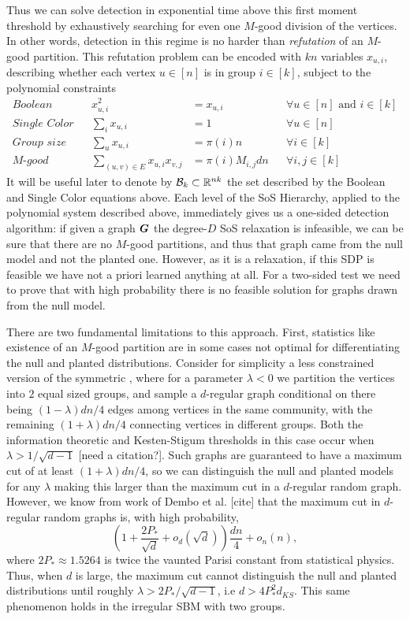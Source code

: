 Thus we can solve detection in exponential time above this first moment threshold by exhaustively searching for even one $M$-good division of the vertices. In other words, detection in this regime is no harder than \emph{refutation} of an $M$-good partition. This refutation problem can be encoded with $kn$ variables $x_{u,i}$, describing whether each vertex $u \in [n]$ is in group $i \in [k]$, subject to the polynomial constraints
%
\begin{align*}
	\textit{Boolean} & & x_{u,i}^2 &= x_{u,i} & &\forall u\in[n] \text{ and } i\in [k] \\
	\textit{Single Color} & & \sum_i x_{u,i} &= 1 & &\forall u\in[n] \\
	\textit{Group size} & &\sum_u x_{u,i} &= \pi(i)n  & & \forall i\in[k]\\
	\textit{$M$-good} & &\sum_{(u,v)\in E} x_{u,i}x_{v,j} &= \pi(i)M_{i,j}dn & &\forall i,j\in[k]
\end{align*}
%
It will be useful later to denote by $\mathcal{B}_k \subset \mathbb{R}^{nk}$ the set described by the Boolean and Single Color equations above. Each level of the SoS Hierarchy, applied to the polynomial system described above, immediately gives us a one-sided detection algorithm: if given a graph $\boldsymbol{G}$ the degree-$D$ SoS relaxation is infeasible, we can be sure that there are no $M$-good partitions, and thus that graph came from the null model and not the planted one. However, as it is a relaxation, if this SDP is feasible we have not a priori learned anything at all. For a two-sided test we need to prove that with high probability there is no feasible solution for graphs drawn from the null model. 

There are two fundamental limitations to this approach. First, statistics like existence of an $M$-good partition are in some cases not optimal for differentiating the null and planted distributions. Consider for simplicity a less constrained version of the symmetric \model, where for a parameter $\lambda<0$ we partition the vertices into $2$ equal sized groups, and sample a $d$-regular graph conditional on there being $(1-\lambda)dn/4$ edges among vertices in the same community, with the remaining $(1 + \lambda)dn/4$ connecting vertices in different groups. Both the information theoretic and Kesten-Stigum thresholds in this case occur when $\lambda > 1/\sqrt{d-1}$ [need a citation?]. Such graphs are guaranteed to have a maximum cut of at least $(1+\lambda)dn/4$, so we can distinguish the null and planted models for any $\lambda$ making this larger than the maximum cut in a $d$-regular random graph. However, we know from work of Dembo et al. [cite] that the maximum cut in $d$-regular random graphs is, with high probability,
$$
    \left(1 + \frac{2P_\ast}{\sqrt d} + o_d(\sqrt d)\right)\frac{dn}{4} + o_n(n),
$$ 
where $2P_\ast \approx 1.5264$ is twice the vaunted Parisi constant from statistical physics. Thus, when $d$ is large, the maximum cut cannot distinguish the null and planted distributions until roughly $\lambda > 2P_\ast/\sqrt{d-1}$, i.e $d > 4P_\ast^2 d_{KS}$. This same phenomenon holds in the irregular SBM with two groups.

